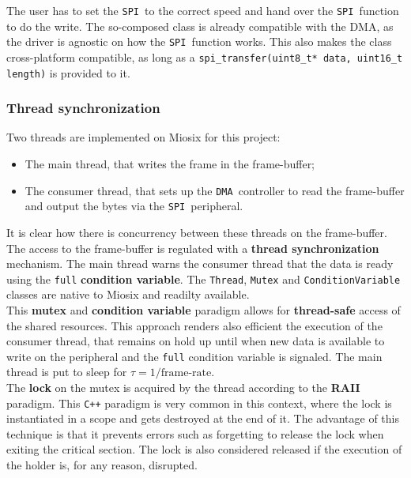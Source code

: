 \documentclass[10pt,a4]{article}
\newcommand{\spi}{\texttt{SPI }}
\newcommand{\dma}{\texttt{DMA }}
\begin{document}
The user has to set the \spi to the correct speed and hand over the \spi function to do the write. The so-composed class is already compatible with the DMA, as the driver is agnostic on how the \spi function works. This also makes the class cross-platform compatible, as long as a \lstinline{spi_transfer(uint8_t* data, uint16_t length)} is provided to it.

\subsubsection{Thread synchronization}


Two threads are implemented on Miosix for this project:
\begin{itemize}
\item The main thread, that writes the frame in the frame-buffer;
\item The consumer thread, that sets up the \dma controller to read the frame-buffer and output the bytes via the \spi peripheral.
\end{itemize}
It is clear how there is  concurrency between these threads on the frame-buffer. The access to the frame-buffer is regulated with a \textbf{thread synchronization} mechanism. The main thread warns the consumer thread that the data is ready using the \lstinline{full} \textbf{condition variable}. The \lstinline{Thread},  \lstinline{Mutex} and  \lstinline{ConditionVariable} classes are native to Miosix and readilty available.   \\

This \textbf{mutex} and \textbf{condition variable} paradigm allows for \textbf{thread-safe} access of the shared resources. This approach renders also efficient the execution of the consumer thread, that remains on hold up until when new data is available to write on the peripheral and the \lstinline{full} condition variable is signaled. The main thread is put to sleep for $\tau = 1 /\text{frame-rate}$. \\

The \textbf{lock} on the mutex is acquired by the thread according to the \textbf{RAII} paradigm. This \texttt{C++} paradigm is very common in this context, where the lock is instantiated in a scope and gets destroyed at the end of it. The advantage of this technique is that it prevents errors such as forgetting to release the lock when exiting the critical section. The lock is also considered released if the execution of the holder is, for any reason, disrupted.\\
\end{document}
